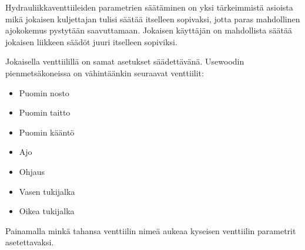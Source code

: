 \documentclass[12pt,a4paper,finnish]{uvmanual}
\begin{document}
Hydrauliikkaventtiileiden parametrien säätäminen on yksi tärkeimmistä asioista mikä jokaisen kuljettajan tulisi säätää itselleen sopivaksi, jotta paras mahdollinen ajokokemus pystytään saavuttamaan. Jokaisen käyttäjän on mahdollista säätää jokaisen liikkeen säädöt juuri itselleen sopiviksi.




Jokaisella venttiilillä on samat asetukset säädettävänä. Usewoodin pienmetsäkoneissa on vähintäänkin seuraavat venttiilit:

\begin{itemize}
 \item Puomin nosto
 \item Puomin taitto
 \item Puomin kääntö
 \item Ajo
 \item Ohjaus
 \item Vasen tukijalka
 \item Oikea tukijalka
\end{itemize}

Painamalla minkä tahansa venttiilin nimeä aukeaa kyseisen venttiilin parametrit asetettavaksi.


\end{document}
